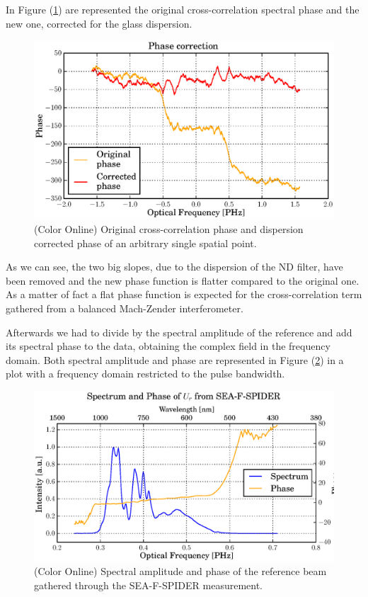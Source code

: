\documentclass[12pt,a4paper,twoside]{article}
\begin{document}
In Figure (\ref{fig_phase_correction}) are represented the original cross-correlation spectral phase and the new one, corrected for the glass dispersion.
\begin{figure}
	\centering
	\includegraphics[scale=0.9]{data/phase_correction}
	\caption{(Color Online) Original cross-correlation phase and dispersion corrected phase of an arbitrary single spatial point.}
	\label{fig_phase_correction}
\end{figure}

As we can see, the two big slopes, due to the dispersion of the ND filter, have been removed and the new phase function is flatter compared to the original one.
As a matter of fact a flat phase function is expected for the cross-correlation term gathered from a balanced Mach-Zender interferometer.

Afterwards we had to divide by the spectral amplitude of the reference and add its spectral phase to the data, obtaining the complex field in the frequency domain.
Both spectral amplitude and phase are represented in Figure (\ref{fig_SPIDER_data}) in a plot with a frequency domain restricted to the pulse bandwidth.
\begin{figure}
	\centering
	\includegraphics[scale=0.9]{data/spider_spectrum_phase}
	\caption{(Color Online) Spectral amplitude and phase of the reference beam gathered through the SEA-F-SPIDER measurement.}
	\label{fig_SPIDER_data}
\end{figure}
\end{document}
